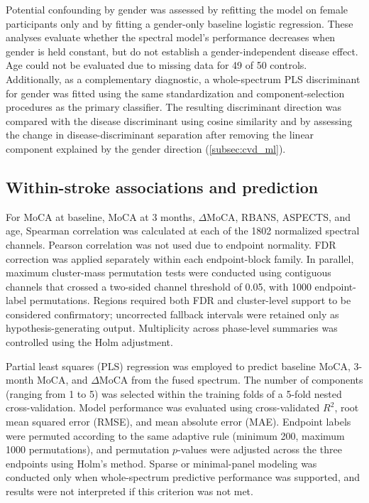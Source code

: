 \documentclass[preprint,12pt]{elsarticle}
\begin{document}
Potential confounding by gender was assessed by refitting the model on female participants only and by fitting a gender-only baseline logistic regression. These analyses evaluate whether the spectral model's performance decreases when gender is held constant, but do not establish a gender-independent disease effect. Age could not be evaluated due to missing data for 49 of 50 controls. Additionally, as a complementary diagnostic, a whole-spectrum PLS discriminant for gender was fitted using the same standardization and component-selection procedures as the primary classifier. The resulting discriminant direction was compared with the disease discriminant using cosine similarity and by assessing the change in disease-discriminant separation after removing the linear component explained by the gender direction (\cref{subsec:cvd_ml}).

\subsection{Within-stroke associations and prediction} \label{subsec:clinical_methods}

For MoCA at baseline, MoCA at 3 months, $\Delta$MoCA, RBANS, ASPECTS, and age, Spearman correlation was calculated at each of the 1802 normalized spectral channels. Pearson correlation was not used due to endpoint normality. FDR correction was applied separately within each endpoint-block family. In parallel, maximum cluster-mass permutation tests were conducted using contiguous channels that crossed a two-sided channel threshold of 0.05, with 1000 endpoint-label permutations. Regions required both FDR and cluster-level support to be considered confirmatory; uncorrected fallback intervals were retained only as hypothesis-generating output. Multiplicity across phase-level summaries was controlled using the Holm adjustment.

Partial least squares (PLS) regression was employed to predict baseline MoCA, 3-month MoCA, and $\Delta$MoCA from the fused spectrum. The number of components (ranging from 1 to 5) was selected within the training folds of a 5-fold nested cross-validation. Model performance was evaluated using cross-validated $R^2$, root mean squared error (RMSE), and mean absolute error (MAE). Endpoint labels were permuted according to the same adaptive rule (minimum 200, maximum 1000 permutations), and permutation $p$-values were adjusted across the three endpoints using Holm's method. Sparse or minimal-panel modeling was conducted only when whole-spectrum predictive performance was supported, and results were not interpreted if this criterion was not met.
\end{document}
